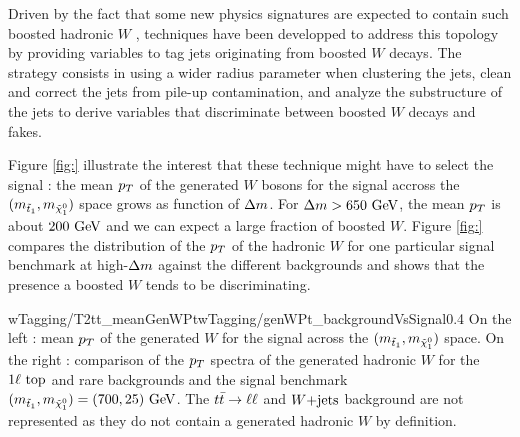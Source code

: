 
             Driven by the fact that some new physics signatures are expected to contain
             such boosted hadronic $W$ , techniques have been developped to
             address this topology by providing variables to tag jets originating from
             boosted $W$ decays. The strategy consists in using a wider radius parameter
             when clustering the jets, clean and correct the jets from pile-up contamination, 
             and analyze the substructure of the jets to derive variables that discriminate 
             between boosted $W$ decays and fakes.

             Figure \ref{fig:} illustrate the interest that these technique might have to
             select the signal : the mean $p_T$ of the generated 
             $W$ bosons for the signal accross the $(m_{\tilde{t}_1}, m_{\tilde{\chi}_1^0})$
             space grows as function of $\Delta m$. For $\Delta m > 650~\text{GeV}$, the 
             mean $p_T$ is about $200~\text{GeV}$ and we can expect a large fraction of boosted $W$. 
             Figure \ref{fig:} compares the distribution of the $p_T$ of the hadronic $W$ for one 
             particular signal benchmark at high-$\Delta m$ against the different backgrounds
             and shows that the presence a boosted $W$ tends to be discriminating.
             
                              {wTagging/T2tt_meanGenWPt}{wTagging/genWPt_backgroundVsSignal}{0.4}
                              {On the left : mean $p_T$ of the generated $W$ for the
                              signal across the $(m_{\tilde{t}_1}, m_{\tilde{\chi}_1^0})$ space.
                              On the right : comparison of the $p_T$ spectra of the generated
                              hadronic $W$ for the $1\ell~\text{top}$ and rare backgrounds and
                              the signal benchmark $(m_{\tilde{t}_1}, m_{\tilde{\chi}_1^0}) = (700,25) ~\text{GeV}$.
                              The $t\bar{t} \rightarrow \ell \ell$ and $\text{$W$+jets}$ background are not represented
                              as they do not contain a generated hadronic $W$ by definition.}

